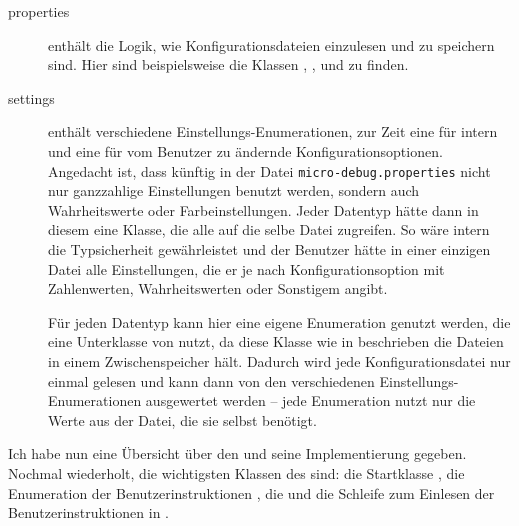 \begin{description}
\item[properties] enthält die Logik, wie Konfigurationsdateien einzulesen und zu speichern sind. Hier sind beispielsweise die Klassen , ,  und  zu finden.
\item[settings] enthält verschiedene Einstellungs-Enumerationen, zur Zeit eine für intern und eine für vom Benutzer zu ändernde Konfigurationsoptionen. Angedacht ist, dass künftig in der Datei \texttt{micro-debug.properties} nicht nur ganzzahlige Einstellungen benutzt werden, sondern auch Wahrheitswerte oder Farbeinstellungen. Jeder Datentyp hätte dann in diesem \package eine Klasse, die alle auf die selbe Datei zugreifen. So wäre intern die Typsicherheit gewährleistet und der Benutzer hätte in einer einzigen Datei alle Einstellungen, die er je nach Konfigurationsoption mit Zahlenwerten, Wahrheitswerten oder Sonstigem angibt.

Für jeden Datentyp kann hier eine eigene Enumeration genutzt werden, die eine Unterklasse von  nutzt, da diese Klasse wie in  beschrieben die Dateien in einem Zwischenspeicher hält. Dadurch wird jede Konfigurationsdatei nur einmal gelesen und kann dann von den verschiedenen Einstellungs-Enumerationen ausgewertet werden -- jede Enumeration nutzt nur die Werte aus der Datei, die sie selbst benötigt.
\end{description}

Ich habe nun eine Übersicht über den \md und seine Implementierung gegeben. Nochmal wiederholt, die wichtigsten Klassen des \md sind: die Startklasse , die Enumeration der Benutzerinstruktionen , die \mic {} und die Schleife zum Einlesen der Benutzerinstruktionen in .